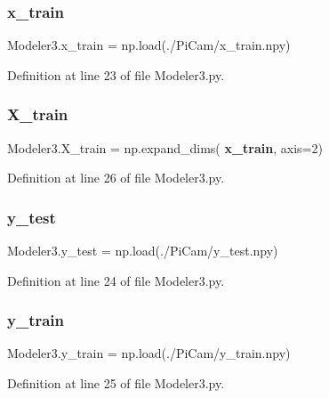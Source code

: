 \subsubsection{x\+\_\+train}
{\footnotesize\ttfamily Modeler3.\+x\+\_\+train = np.\+load(\textquotesingle{}./Pi\+Cam/x\+\_\+train.\+npy\textquotesingle{})}



Definition at line 23 of file Modeler3.\+py.

\mbox{\label{namespace_modeler3_af2e61602b321aff37229f87a2958b123}} 
\subsubsection{X\+\_\+train}
{\footnotesize\ttfamily Modeler3.\+X\+\_\+train = np.\+expand\+\_\+dims(\textbf{ x\+\_\+train}, axis=2)}



Definition at line 26 of file Modeler3.\+py.

\mbox{\label{namespace_modeler3_ac6467f796b883c95aab4c27344abd927}} 
\subsubsection{y\+\_\+test}
{\footnotesize\ttfamily Modeler3.\+y\+\_\+test = np.\+load(\textquotesingle{}./Pi\+Cam/y\+\_\+test.\+npy\textquotesingle{})}



Definition at line 24 of file Modeler3.\+py.

\mbox{\label{namespace_modeler3_ac2e585f1f5aa8adea01db618c553151c}} 
\subsubsection{y\+\_\+train}
{\footnotesize\ttfamily Modeler3.\+y\+\_\+train = np.\+load(\textquotesingle{}./Pi\+Cam/y\+\_\+train.\+npy\textquotesingle{})}



Definition at line 25 of file Modeler3.\+py.

